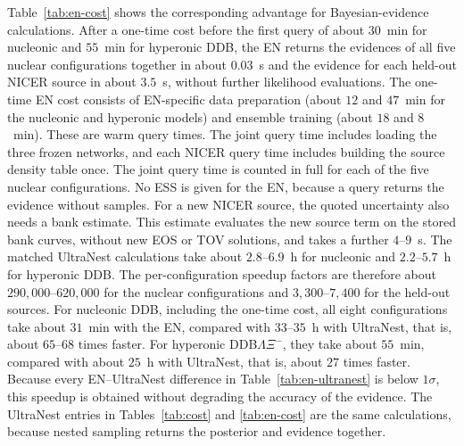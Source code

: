 \documentclass[aps,prd,twocolumn,superscriptaddress,nofootinbib,longbibliography]{revtex4-2}
\begin{document}
Table~\ref{tab:en-cost} shows the corresponding advantage for
Bayesian-evidence calculations. After a one-time cost before the first query of
about $30$~min for nucleonic and $55$~min for hyperonic DDB, the EN returns the
evidences of all five nuclear configurations together in about $0.03$~s and
the evidence for each held-out NICER source in about $3.5$~s, without further
likelihood evaluations. The one-time EN cost consists of EN-specific data preparation (about $12$ and
$47$~min for the nucleonic and hyperonic models) and ensemble training (about $18$
and $8$~min). These are warm query times. The joint query time includes loading
the three frozen networks, and each NICER query time includes building the source
density table once. The joint query time is counted in full for each of the five
nuclear configurations. No ESS is given for the EN, because a query returns the
evidence without samples. For a new NICER source, the quoted uncertainty also
needs a bank estimate. This estimate evaluates the new source term on the stored
bank curves, without new EOS or TOV solutions, and takes a further $4$--$9$~s.
The matched UltraNest calculations take about
$2.8$--$6.9$~h for nucleonic and $2.2$--$5.7$~h for hyperonic DDB. The
per-configuration speedup factors are therefore about $290{,}000$--$620{,}000$
for the nuclear configurations and $3{,}300$--$7{,}400$ for the held-out
sources. For nucleonic DDB, including the one-time cost, all eight
configurations take about $31$~min with the EN, compared with $33$--$35$~h with
UltraNest, that is, about $65$--$68$ times faster. For hyperonic
DDB$\Lambda\Xi^-$, they take about $55$~min, compared with about $25$~h with
UltraNest, that is, about $27$ times faster. Because every EN--UltraNest
difference in Table~\ref{tab:en-ultranest} is below $1\sigma$, this speedup is
obtained without degrading the accuracy of the evidence. The UltraNest entries
in Tables~\ref{tab:cost} and \ref{tab:en-cost} are the same calculations,
because nested sampling returns the posterior and evidence together.
\end{document}
